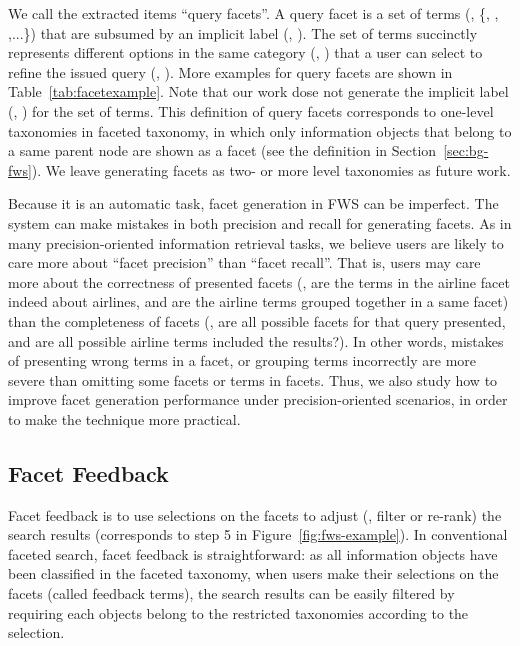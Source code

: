 We call the extracted items ``query facets''. A query facet is a set of terms (\eg, \{, , ,...\}) that are subsumed by an implicit label (\eg, ). The set of terms succinctly represents different options in the same category (\eg, ) that a user can select to refine the issued query (\eg, ). More examples for query facets are shown in Table~\ref{tab:facetexample}. Note that our work dose not generate the implicit label (\eg, ) for the set of terms. This definition of query facets corresponds to one-level taxonomies in faceted taxonomy, in which only information objects that belong to a same parent node are shown as a facet (see the definition in Section~\ref{sec:bg-fws}). We leave generating facets as two- or more level taxonomies as future work.

Because it is an automatic task, facet generation in FWS can be imperfect. The system can make mistakes in both precision and recall for generating facets. As in many precision-oriented information retrieval tasks, we believe users are likely to care more about ``facet precision'' than ``facet recall''. That is, users may care more about the correctness of presented facets (\eg, are the terms in the airline facet indeed about airlines, and are the airline terms grouped together in a same facet) than the completeness of facets (\eg, are all possible facets for that query presented, and are all possible airline terms included the results?). In other words, mistakes of presenting wrong terms in a facet, or grouping terms incorrectly are more severe than omitting some facets or terms in facets. Thus, we also study how to improve facet generation performance under precision-oriented scenarios, in order to make the technique more practical.

\subsection{Facet Feedback}
Facet feedback is to use selections on the facets to adjust (\eg, filter or re-rank) the search results (corresponds to step 5 in Figure~\ref{fig:fws-example}). In conventional faceted search, facet feedback is straightforward: as all information objects have been classified in the faceted taxonomy, when users make their selections on the facets (called feedback terms), the search results can be easily filtered by requiring each objects belong to the restricted taxonomies according to the selection.

